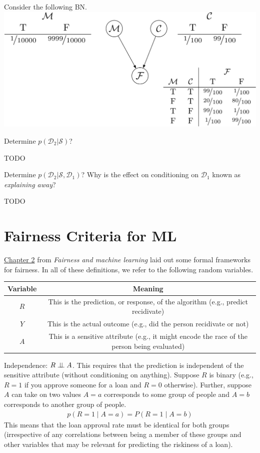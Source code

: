 \documentclass{tufte-handout}
\begin{document}
\begin{exercise}
Consider the following BN.
\includegraphics[width=0.6\linewidth]{figures/medicaldiagnosis}
\bes
\item Determine $p(\mathcal{D}_2|\mathcal{S})$?
\begin{boxedsolution}
TODO
\end{boxedsolution}
\item Determine $p(\mathcal{D}_2|\mathcal{S}, \mathcal{D}_1)$?  Why is the effect on conditioning on $\mathcal{D}_1$ known as \emph{explaining away}?
\begin{boxedsolution}
TODO
\end{boxedsolution}
\ees
\end{exercise}

\section{Fairness Criteria for ML}

\href{https://fairmlbook.org/classification.html}{Chapter 2} from \emph{Fairness and machine learning} laid out some formal frameworks for fairness.  In all of these definitions, we refer to the following random variables.

\vspace{1em}
\begin{tabular}{c | c}
\textbf{Variable} & \textbf{Meaning} \\
\hline
$R$ & This is the prediction, or response, of the algorithm (e.g., predict recidivate) \\
$Y$ & This is the actual outcome (e.g., did the person recidivate or not) \\
$A$ & This is a sensitive attribute (e.g., it might encode the race of the person being evaluated)
\end{tabular}


\bi
\item Independence: $R \perp\!\!\!\perp A$.  This requires that the prediction is independent of the sensitive attribute (without conditioning on anything).  Suppose $R$ is binary (e.g., $R=1$ if you approve someone for a loan and $R=0$ otherwise).  Further, suppose $A$ can take on two values $A=a$ corresponds to some group of people and $A=b$ corresponds to another group of people.
\begin{align}
p(R=1\mid A=a) = P(R=1 \mid A=b)
\end{align}
This means that the loan approval rate must be identical for both groups (irrespective of any correlations between being a member of these groups and other variables that may be relevant for predicting the riskiness of a loan).
\end{document}

